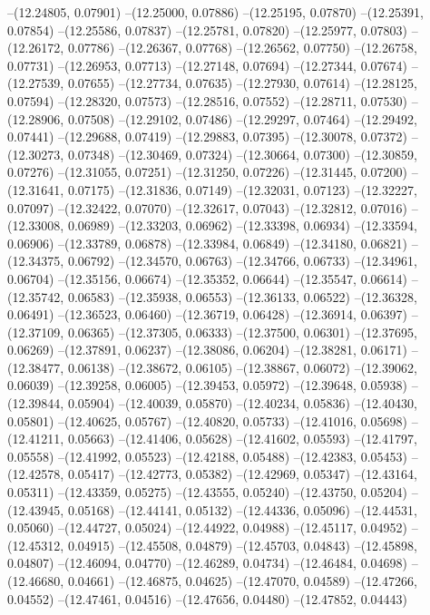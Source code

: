 --(12.24805, 0.07901)
--(12.25000, 0.07886)
--(12.25195, 0.07870)
--(12.25391, 0.07854)
--(12.25586, 0.07837)
--(12.25781, 0.07820)
--(12.25977, 0.07803)
--(12.26172, 0.07786)
--(12.26367, 0.07768)
--(12.26562, 0.07750)
--(12.26758, 0.07731)
--(12.26953, 0.07713)
--(12.27148, 0.07694)
--(12.27344, 0.07674)
--(12.27539, 0.07655)
--(12.27734, 0.07635)
--(12.27930, 0.07614)
--(12.28125, 0.07594)
--(12.28320, 0.07573)
--(12.28516, 0.07552)
--(12.28711, 0.07530)
--(12.28906, 0.07508)
--(12.29102, 0.07486)
--(12.29297, 0.07464)
--(12.29492, 0.07441)
--(12.29688, 0.07419)
--(12.29883, 0.07395)
--(12.30078, 0.07372)
--(12.30273, 0.07348)
--(12.30469, 0.07324)
--(12.30664, 0.07300)
--(12.30859, 0.07276)
--(12.31055, 0.07251)
--(12.31250, 0.07226)
--(12.31445, 0.07200)
--(12.31641, 0.07175)
--(12.31836, 0.07149)
--(12.32031, 0.07123)
--(12.32227, 0.07097)
--(12.32422, 0.07070)
--(12.32617, 0.07043)
--(12.32812, 0.07016)
--(12.33008, 0.06989)
--(12.33203, 0.06962)
--(12.33398, 0.06934)
--(12.33594, 0.06906)
--(12.33789, 0.06878)
--(12.33984, 0.06849)
--(12.34180, 0.06821)
--(12.34375, 0.06792)
--(12.34570, 0.06763)
--(12.34766, 0.06733)
--(12.34961, 0.06704)
--(12.35156, 0.06674)
--(12.35352, 0.06644)
--(12.35547, 0.06614)
--(12.35742, 0.06583)
--(12.35938, 0.06553)
--(12.36133, 0.06522)
--(12.36328, 0.06491)
--(12.36523, 0.06460)
--(12.36719, 0.06428)
--(12.36914, 0.06397)
--(12.37109, 0.06365)
--(12.37305, 0.06333)
--(12.37500, 0.06301)
--(12.37695, 0.06269)
--(12.37891, 0.06237)
--(12.38086, 0.06204)
--(12.38281, 0.06171)
--(12.38477, 0.06138)
--(12.38672, 0.06105)
--(12.38867, 0.06072)
--(12.39062, 0.06039)
--(12.39258, 0.06005)
--(12.39453, 0.05972)
--(12.39648, 0.05938)
--(12.39844, 0.05904)
--(12.40039, 0.05870)
--(12.40234, 0.05836)
--(12.40430, 0.05801)
--(12.40625, 0.05767)
--(12.40820, 0.05733)
--(12.41016, 0.05698)
--(12.41211, 0.05663)
--(12.41406, 0.05628)
--(12.41602, 0.05593)
--(12.41797, 0.05558)
--(12.41992, 0.05523)
--(12.42188, 0.05488)
--(12.42383, 0.05453)
--(12.42578, 0.05417)
--(12.42773, 0.05382)
--(12.42969, 0.05347)
--(12.43164, 0.05311)
--(12.43359, 0.05275)
--(12.43555, 0.05240)
--(12.43750, 0.05204)
--(12.43945, 0.05168)
--(12.44141, 0.05132)
--(12.44336, 0.05096)
--(12.44531, 0.05060)
--(12.44727, 0.05024)
--(12.44922, 0.04988)
--(12.45117, 0.04952)
--(12.45312, 0.04915)
--(12.45508, 0.04879)
--(12.45703, 0.04843)
--(12.45898, 0.04807)
--(12.46094, 0.04770)
--(12.46289, 0.04734)
--(12.46484, 0.04698)
--(12.46680, 0.04661)
--(12.46875, 0.04625)
--(12.47070, 0.04589)
--(12.47266, 0.04552)
--(12.47461, 0.04516)
--(12.47656, 0.04480)
--(12.47852, 0.04443)
